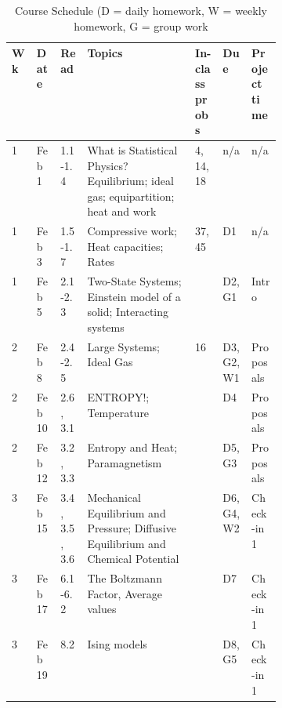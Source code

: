 \documentclass[12pt]{article}
\begin{document}
\setlength{\arrayrulewidth}{.4mm}
\setlength{\tabcolsep}{8pt}
{
  \begin{table}[]
    \footnotesize
\caption{\footnotesize{Course Schedule (D = daily homework, W = weekly homework, G = group work}}
\label{tab:course-calendar}
\begin{tabular}{p{.03\linewidth}|p{.065\linewidth}|p{.065\linewidth}|p{0.4\linewidth}|p{.08\linewidth}|p{.085\linewidth}|p{.1\linewidth}}
\textbf{Wk} & \textbf{Date}    & \textbf{Read}        & \textbf{Topics} & \textbf{In-class probs} & \textbf{Due}    & \textbf{Project time}  \\ \hline 
1    & Feb 1  & 1.1-1.4        & What is Statistical Physics? Equilibrium; ideal gas; equipartition; heat and work  & 4, 14, 18                           & n/a          & n/a           \\
1    & Feb 3  & 1.5-1.7        & Compressive work; Heat capacities; Rates                               & 37, 45                                & D1           & n/a           \\
1    & Feb 5  & 2.1-2.3        & Two-State Systems; Einstein model of a solid; Interacting systems                   &                                           & D2, G1       & Intro \\ \hline
2    & Feb 8  & 2.4-2.5        & Large Systems; Ideal Gas                                                            &  16 & D3, G2, W1   & Proposals     \\
2    & Feb 10 & 2.6, 3.1       & ENTROPY!; Temperature                                                               &                                           & D4           & Proposals     \\
2    & Feb 12 & 3.2, 3.3       & Entropy and Heat; Paramagnetism                                                     &                                           & D5, G3       & Proposals     \\ \hline
3    & Feb 15 & 3.4, 3.5, 3.6  & Mechanical Equilibrium and Pressure; Diffusive Equilibrium and Chemical Potential   &                                           & D6, G4, W2   & Check-in 1    \\
3    & Feb 17 & 6.1-6.2        & The Boltzmann Factor, Average values                                                &                                           & D7           & Check-in 1    \\
3    & Feb 19 & 8.2            & Ising models                                                                        &                                           & D8, G5       & Check-in 1    \\ \hline

\end{tabular}
\end{table}}
\end{document}

